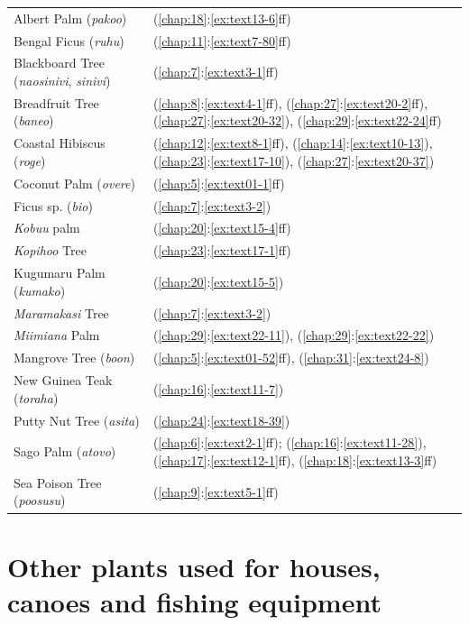 \begin{tabularx}{\textwidth}{p{}X}
    Albert Palm (\textit{pakoo})&(\ref{chap:18}:\ref{ex:text13-6}ff)\\
    Bengal Ficus (\textit{ruhu})&(\ref{chap:11}:\ref{ex:text7-80}ff)\\
    Blackboard Tree (\textit{naosinivi}, \textit{sinivi})&(\ref{chap:7}:\ref{ex:text3-1}ff)\\
    Breadfruit Tree (\textit{baneo})&(\ref{chap:8}:\ref{ex:text4-1}ff), (\ref{chap:27}:\ref{ex:text20-2}ff), (\ref{chap:27}:\ref{ex:text20-32}), (\ref{chap:29}:\ref{ex:text22-24}ff)\\
    Coastal Hibiscus (\textit{roge})&(\ref{chap:12}:\ref{ex:text8-1}ff), (\ref{chap:14}:\ref{ex:text10-13}), (\ref{chap:23}:\ref{ex:text17-10}), (\ref{chap:27}:\ref{ex:text20-37})\\
    Coconut Palm (\textit{overe})&(\ref{chap:5}:\ref{ex:text01-1}ff)\\
    Ficus sp. (\textit{bio})&(\ref{chap:7}:\ref{ex:text3-2})\\
    \textit{Kobuu} palm&(\ref{chap:20}:\ref{ex:text15-4}ff)\\
    \textit{Kopihoo} Tree&(\ref{chap:23}:\ref{ex:text17-1}ff)\\
    Kugumaru Palm (\textit{kumako})&(\ref{chap:20}:\ref{ex:text15-5})\\
    \textit{Maramakasi} Tree&(\ref{chap:7}:\ref{ex:text3-2})\\
    \textit{Miimiana} Palm&(\ref{chap:29}:\ref{ex:text22-11}), (\ref{chap:29}:\ref{ex:text22-22})\\
    Mangrove Tree (\textit{boon})&(\ref{chap:5}:\ref{ex:text01-52}ff), (\ref{chap:31}:\ref{ex:text24-8})\\
    New Guinea Teak (\textit{toraha})&(\ref{chap:16}:\ref{ex:text11-7})\\
    Putty Nut Tree (\textit{asita})&(\ref{chap:24}:\ref{ex:text18-39})\\
    Sago Palm (\textit{atovo})&(\ref{chap:6}:\ref{ex:text2-1}ff); (\ref{chap:16}:\ref{ex:text11-28}), (\ref{chap:17}:\ref{ex:text12-1}ff), (\ref{chap:18}:\ref{ex:text13-3}ff)\\
    Sea Poison Tree (\textit{poosusu})&(\ref{chap:9}:\ref{ex:text5-1}ff)\\
\end{tabularx}

\section{Other plants used for houses, canoes and fishing equipment}\label{ind:otherplants}

